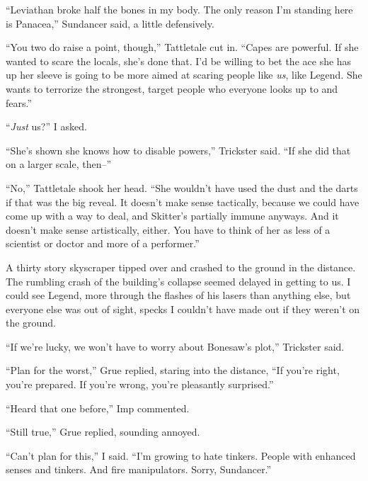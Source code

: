 ``Leviathan broke half the bones in my body.  The only reason I'm standing here is Panacea,'' Sundancer said, a little defensively.



``You two do raise a point, though,'' Tattletale cut in.  ``Capes are powerful.  If she wanted to scare the locals, she's done that.  I'd be willing to bet the ace she has up her sleeve is going to be more aimed at scaring people like \emph{us}, like Legend.  She wants to terrorize the strongest, target people who everyone looks up to and fears.''



``\emph{Just} us?'' I asked.



``She's shown she knows how to disable powers,'' Trickster said.  ``If she did that on a larger scale, then--''



``No,'' Tattletale shook her head.  ``She wouldn't have used the dust and the darts if that was the big reveal.  It doesn't make sense tactically, because we could have come up with a way to deal, and Skitter's partially immune anyways.  And it doesn't make sense artistically, either.  You have to think of her as less of a scientist or doctor and more of a performer.''



A thirty story skyscraper tipped over and crashed to the ground in the distance.  The rumbling crash of the building's collapse seemed delayed in getting to us.  I could see Legend, more through the flashes of his lasers than anything else, but everyone else was out of sight, specks I couldn't have made out if they weren't on the ground.



``If we're lucky, we won't have to worry about Bonesaw's plot,'' Trickster said.



``Plan for the worst,'' Grue replied, staring into the distance, ``If you're right, you're prepared.  If you're wrong, you're pleasantly surprised.''



``Heard that one before,'' Imp commented.



``Still true,'' Grue replied, sounding annoyed.



``Can't plan for this,'' I said.  ``I'm growing to hate tinkers.  People with enhanced senses and tinkers.  And fire manipulators.  Sorry, Sundancer.''



